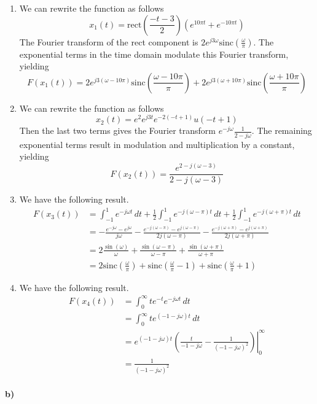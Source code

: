 \documentclass[12pt]{article}
\begin{document}
\begin{enumerate}
    \item We can rewrite the function as follows
    \[x_1(t)=\text{rect}\left(\frac{-t-3}{2}\right)(e^{10\pi t} + e^{-10\pi t})\]
    The Fourier transform of the rect component is \(2e^{j3\omega}\text{sinc}\left(\frac{\omega}{\pi}\right)\). The exponential terms in the time domain modulate this Fourier transform, yielding
    \[F(x_1(t))=2e^{j3(\omega-10\pi)}\text{sinc}\left(\frac{\omega-10\pi}{\pi}\right)+2e^{j3(\omega+10\pi)}\text{sinc}\left(\frac{\omega+10\pi}{\pi}\right)\]
    \item We can rewrite the function as follows
    \[x_2(t)=e^2e^{j3t}e^{-2(-t+1)}u(-t+1)\]
    Then the last two terms gives the Fourier transform \(e^{-j\omega}\frac{1}{2-j\omega}\). The remaining exponential terms result in modulation and multiplication by a constant, yielding
    \[F(x_2(t))=\frac{e^{2-j(\omega-3)}}{2-j(\omega-3)}\]
    \item We have the following result.
    \begin{align*}
        F(x_3(t))&=\int_{-1}^1 e^{-j\omega t}\,dt + \frac{1}{2}\int_{-1}^1 e^{-j(\omega-\pi)t}\,dt + \frac{1}{2}\int_{-1}^1 e^{-j(\omega+\pi)t}\,dt\\
        &=-\frac{e^{-j\omega}-e^{j\omega}}{j\omega} - \frac{e^{-j(\omega-\pi)}-e^{j(\omega-\pi)}}{2j(\omega-\pi)} - \frac{e^{-j(\omega+\pi)}-e^{j(\omega+\pi)}}{2j(\omega+\pi)}\\
        &=2\frac{\sin(\omega)}{\omega}+\frac{\sin(\omega-\pi)}{\omega-\pi}+ \frac{\sin(\omega+\pi)}{\omega+\pi}\\
        &=2\text{sinc}\left(\frac{\omega}{\pi}\right) + \text{sinc}\left(\frac{\omega}{\pi}-1\right) + \text{sinc}\left(\frac{\omega}{\pi}+1\right)
    \end{align*}
    \item We have the following result.
    \begin{align*}
        F(x_4(t))&=\int_{0}^\infty te^{-t}e^{-j\omega t}\,dt\\
        &=\int_{0}^\infty te^{(-1-j\omega) t}\,dt\\
        &=\left.e^{(-1-j\omega) t}\left(\frac{t}{-1-j\omega}-\frac{1}{(-1-j\omega)^2}\right)\right|_0^\infty\\
        &=\frac{1}{(-1-j\omega)^2}
    \end{align*}
\end{enumerate}

\paragraph{b)}
\end{document}

